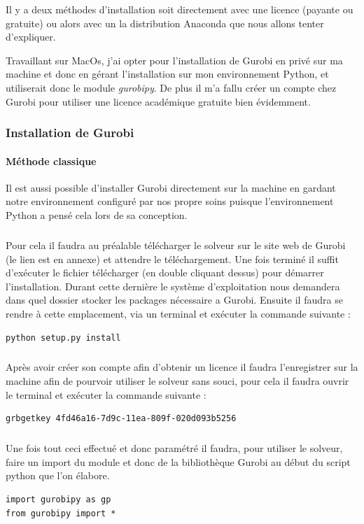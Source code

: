 \documentclass[a4paper, 12pt, twoside]{article}
\begin{document}
Il y a deux méthodes d'installation soit directement avec une licence (payante ou gratuite) ou alors avec un la distribution \textsf{Anaconda} que nous allons tenter d'expliquer. \newline

Travaillant sur MacOs, j'ai opter pour l'installation de \textsf{Gurobi} en privé sur ma machine et donc en gérant l'installation sur mon environnement Python, et utiliserait donc le module \emph{gurobipy}. De plus il m'a fallu créer un compte chez \textsf{Gurobi} pour utiliser une licence académique gratuite bien évidemment. 

\subsubsection{Installation de Gurobi}
\paragraph{Méthode classique }Il est aussi possible d'installer \textsf{Gurobi} directement sur la machine en gardant notre environnement configuré par nos propre soins puisque l'environnement Python a pensé cela lors de sa conception.
\subparagraph{}{Pour cela il faudra au préalable télécharger le solveur sur le site web de \textsf{Gurobi} (le lien est en annexe) et attendre le téléchargement. Une fois terminé il suffit d'exécuter le fichier télécharger (en double cliquant dessus) pour démarrer l'installation. Durant cette dernière le système d'exploitation nous demandera dans quel dossier stocker les packages nécessaire a \textsf{Gurobi}. Ensuite il faudra se rendre à cette emplacement, via un terminal et exécuter la commande suivante :}
\begin{verbatim}
python setup.py install
\end{verbatim}
\subparagraph{}{Après avoir créer son compte afin d'obtenir un licence il faudra l'enregistrer sur la machine afin de pourvoir utiliser le solveur sans souci, pour cela il faudra ouvrir le terminal et exécuter la commande suivante :}
\begin{verbatim}
grbgetkey 4fd46a16-7d9c-11ea-809f-020d093b5256
\end{verbatim}
\subparagraph{}{Une fois tout ceci effectué et donc paramétré il faudra, pour utiliser le solveur, faire un \textsf{import} du module et donc de la bibliothèque \textsf{Gurobi} au début du script python que l'on élabore.}
\begin{verbatim}
import gurobipy as gp
from gurobipy import *
\end{verbatim}
\end{document}
